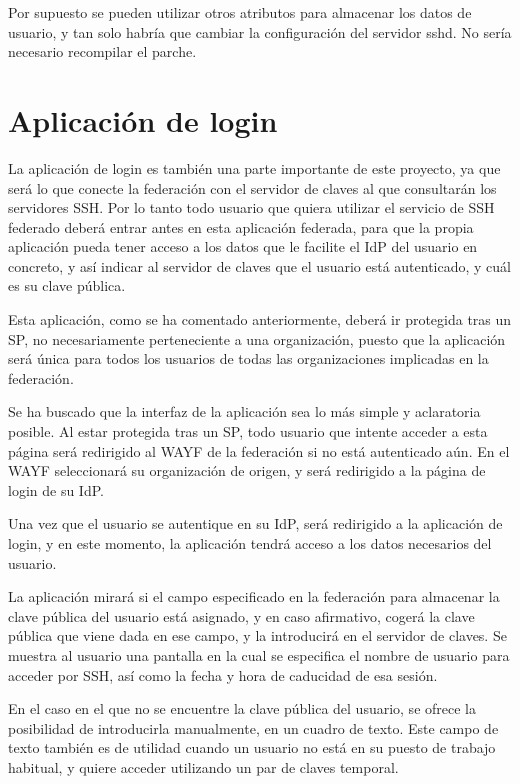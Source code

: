     Por supuesto se pueden utilizar otros atributos para almacenar los
    datos de usuario, y tan solo habría que cambiar la configuración del
    servidor sshd. No sería necesario recompilar el parche.

    \section{Aplicación de login}
    

    La aplicación de login es también una parte importante de este
    proyecto, ya que será lo que conecte la federación con el servidor de
    claves al que consultarán los servidores SSH. Por lo tanto todo usuario
    que quiera utilizar el servicio de SSH federado deberá entrar antes en
    esta aplicación federada, para que la propia aplicación pueda tener
    acceso a los datos que le facilite el IdP del usuario en concreto, y
    así indicar al servidor de claves que el usuario está autenticado, y
    cuál es su clave pública.

    Esta aplicación, como se ha comentado anteriormente, deberá ir
    protegida tras un SP, no necesariamente perteneciente a una
    organización, puesto que la aplicación será única para todos los
    usuarios de todas las organizaciones implicadas en la federación.

    Se ha buscado que la interfaz de la aplicación sea lo más simple y
    aclaratoria posible. Al estar protegida tras un SP, todo usuario que
    intente acceder a esta página será redirigido al WAYF de la federación
    si no está autenticado aún. En el WAYF seleccionará su organización de
    origen, y será redirigido a la página de login de su IdP.

    Una vez que el usuario se autentique en su IdP, será redirigido a la
    aplicación de login, y en este momento, la aplicación tendrá acceso a
    los datos necesarios del usuario.

    La aplicación mirará si el campo especificado en la federación para
    almacenar la clave pública del usuario está asignado, y en caso
    afirmativo, cogerá la clave pública que viene dada en ese campo, y la
    introducirá en el servidor de claves. Se muestra al usuario una
    pantalla en la cual se especifica el nombre de usuario para acceder por
    SSH, así como la fecha y hora de caducidad de esa sesión.

    En el caso en el que no se encuentre la clave pública del usuario, se
    ofrece la posibilidad de introducirla manualmente, en un cuadro de
    texto. Este campo de texto también es de utilidad cuando un usuario no
    está en su puesto de trabajo habitual, y quiere acceder utilizando un
    par de claves temporal.

